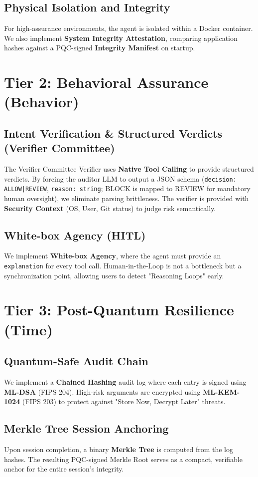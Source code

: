 \documentclass[conference]{IEEEtran}
\begin{document}
\subsection{Physical Isolation and Integrity}
For high-assurance environments, the agent is isolated within a Docker container. We also implement \textbf{System Integrity Attestation}, comparing application hashes against a PQC-signed \textbf{Integrity Manifest} on startup.

\section{Tier 2: Behavioral Assurance (Behavior)}
\subsection{Intent Verification \& Structured Verdicts (Verifier Committee)}
The Verifier Committee Verifier uses \textbf{Native Tool Calling} to provide structured verdicts. By forcing the auditor LLM to output a JSON schema (\texttt{decision: ALLOW|REVIEW}, \texttt{reason: string}; BLOCK is mapped to REVIEW for mandatory human oversight), we eliminate parsing brittleness. The verifier is provided with \textbf{Security Context} (OS, User, Git status) to judge risk semantically.

\subsection{White-box Agency (HITL)}
We implement \textbf{White-box Agency}, where the agent must provide an \texttt{explanation} for every tool call. Human-in-the-Loop is not a bottleneck but a synchronization point, allowing users to detect "Reasoning Loops" early.

\section{Tier 3: Post-Quantum Resilience (Time)}
\subsection{Quantum-Safe Audit Chain}
We implement a \textbf{Chained Hashing} audit log where each entry is signed using \textbf{ML-DSA} (FIPS 204). High-risk arguments are encrypted using \textbf{ML-KEM-1024} (FIPS 203) to protect against "Store Now, Decrypt Later" threats.

\subsection{Merkle Tree Session Anchoring}
Upon session completion, a binary \textbf{Merkle Tree} is computed from the log hashes. The resulting PQC-signed Merkle Root serves as a compact, verifiable anchor for the entire session's integrity.
\end{document}
